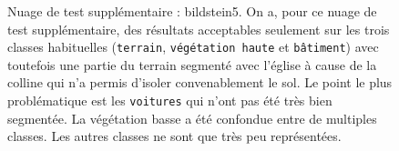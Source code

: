 \documentclass[a4paper, onecolumn, 11pt]{article}
\begin{document}
\begin{figure}[h]
    \caption{Nuage de test supplémentaire : bildstein5. On a, pour ce nuage de test supplémentaire, des résultats acceptables seulement sur les trois classes habituelles (\texttt{terrain}, \texttt{végétation haute} et \texttt{bâtiment}) avec toutefois une partie du terrain segmenté avec l'église à cause de la colline qui n'a permis d'isoler convenablement le sol. Le point le plus problématique est les \texttt{voitures} qui n'ont pas été très bien segmentée. La végétation basse a été confondue entre de multiples classes. Les autres classes ne sont que très peu représentées.}
    \label{fig:bildstein5}
\end{figure}
\end{document}

